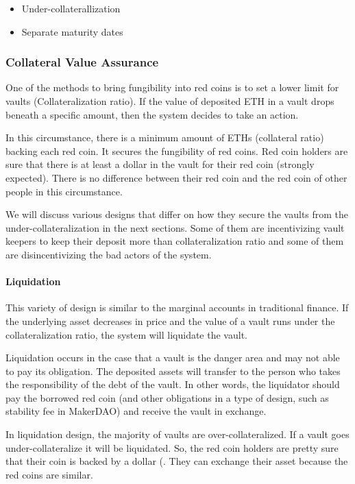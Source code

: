 \begin{itemize}
  \item Under-collaterallization
  \item Separate maturity dates
\end{itemize} 


\subsubsection{Collateral Value Assurance}

One of the methods to bring fungibility into red coins is to set a lower limit for vaults (Collateralization ratio). If the value of deposited ETH in a vault drops beneath a specific amount, then the system decides to take an action. 

In this circumstance, there is a minimum amount of ETHs (collateral ratio)  backing each red coin. It secures the fungibility of red coins. Red coin holders are sure that there is at least a dollar in the vault for their red coin  (strongly expected). There is no difference between their red coin and the red coin of other people in this circumstance.

We will discuss various designs that differ on how they secure the vaults from the under-collateralization in the next sections. Some of them are incentivizing vault keepers to keep their deposit more than collateralization ratio and some of them are disincentivizing the bad actors of the system.
 
\paragraph{Liquidation}
This variety of design is similar to the marginal accounts in traditional finance. If the underlying asset decreases in price and the value of a vault runs under the collateralization ratio, the system will liquidate the vault.

Liquidation occurs in the case that a vault is the danger area and may not able to pay its obligation. The deposited assets will transfer to the person who takes the responsibility of the debt of the vault. In other words, the liquidator should pay the borrowed red coin (and other obligations in a type of design, such as stability fee in MakerDAO) and receive the vault in exchange.


In liquidation design, the majority of vaults are over-collateralized. If a vault goes under-collateralize it will be liquidated. So, the red coin holders are pretty sure that their coin is backed by a dollar (. They can exchange their asset because the red coins are similar.

